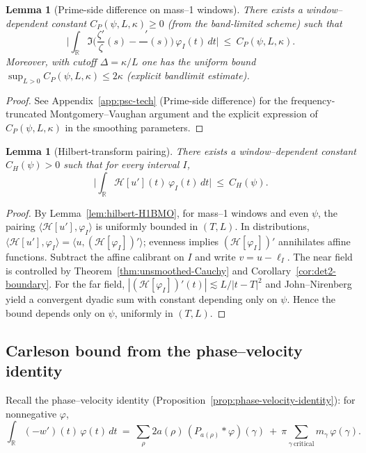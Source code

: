 \documentclass[11pt]{article}
\newtheorem{lemma}[theorem]{Lemma}
\theoremstyle{definition}
\theoremstyle{remark}
\newcommand{\R}{\mathbb{R}}
\DeclareMathOperator{\dettwo}{det_2}
\begin{document}
\begin{lemma}[Prime-side difference on mass–1 windows]\label{lem:prime-short}
There exists a window–dependent constant \(C_P(\psi,L,\kappa)\ge 0\) (from the band-limited scheme) such that
\[ \Big|\int_{\R} \Im\Big(\frac{\zeta'}{\zeta}(s)-\frac{\dettwo'}{\dettwo}(s)\Big)\,\varphi_I(t)\,dt\Big|\ \le\ C_P(\psi,L,\kappa).\]
Moreover, with cutoff \(\Delta=\kappa/L\) one has the uniform bound \(\sup_{L>0} C_P(\psi,L,\kappa)\le 2\kappa\) (explicit bandlimit estimate).
\end{lemma}
\begin{proof}
See Appendix~\ref{app:psc-tech} (Prime-side difference) for the frequency-truncated Montgomery--Vaughan argument and the explicit expression of \(C_P(\psi,L,\kappa)\) in the smoothing parameters.
\end{proof}

\begin{lemma}[Hilbert-transform pairing]\label{lem:hilbert-aux2}
There exists a window–dependent constant \(C_H(\psi)>0\) such that for every interval \(I\),
\[ \Big|\int_{\R} \mathcal H[u'](t)\,\varphi_I(t)\,dt\Big|\ \le\ C_H(\psi).\]
\end{lemma}
\begin{proof}
By Lemma~\ref{lem:hilbert-H1BMO}, for mass–1 windows and even \(\psi\), the pairing \(\langle \mathcal H[u'],\varphi_I\rangle\) is uniformly bounded in \((T,L)\). In distributions, \(\langle \mathcal H[u'],\varphi_I\rangle=\langle u,(\mathcal H[\varphi_I])'\rangle\); evenness implies \((\mathcal H[\varphi_I])'\) annihilates affine functions. Subtract the affine calibrant on \(I\) and write \(v=u-\ell_I\). The near field is controlled by Theorem~\ref{thm:unsmoothed-Cauchy} and Corollary~\ref{cor:det2-boundary}. For the far field, \(|(\mathcal H[\varphi_I])'(t)|\lesssim L/|t-T|^2\) and John–Nirenberg yield a convergent dyadic sum with constant depending only on \(\psi\). Hence the bound depends only on \(\psi\), uniformly in \((T,L)\).
\end{proof}

\subsection{Carleson bound from the phase--velocity identity}
Recall the phase--velocity identity (Proposition~\ref{prop:phase-velocity-identity}): for nonnegative \(\varphi\),
\[ \int_{\R}(-w')(t)\,\varphi(t)\,dt\ =\ \sum_{\rho}2a(\rho)\,(P_{a(\rho)}*\varphi)(\gamma)\ +\ \pi\sum_{\gamma\ \mathrm{critical}} m_\gamma\,\varphi(\gamma).\]
\end{document}
